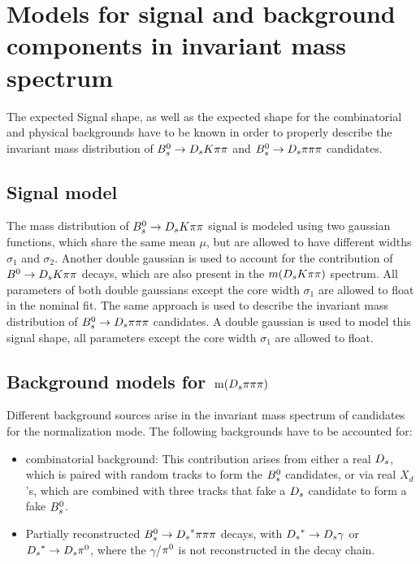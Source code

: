 \section{Models for signal and background components in invariant mass spectrum}
\label{sec: model}

The expected Signal shape, as well as the expected shape for the combinatorial and physical backgrounds have to be known in order to properly describe the invariant mass distribution of 
${{B}^0_{s}}\rightarrow{\ensuremath{{D}_{s}}}{\ensuremath{K}}{\ensuremath{\pi}}{\ensuremath{\pi}}$ and ${{B}^0_{s}}\rightarrow{\ensuremath{{D}_{s}}}{\ensuremath{\pi}}{\ensuremath{\pi}}{\ensuremath{\pi}}$ candidates.

\subsection{Signal model}
\label{subsec: signalmodel}
The mass distribution of ${{B}^0_{s}}\rightarrow{\ensuremath{{D}_{s}}}{\ensuremath{K}}{\ensuremath{\pi}}{\ensuremath{\pi}}$ signal is modeled using two gaussian functions, which share the same mean $\mu$, but are allowed to have different widths $\sigma_{1}$ and $\sigma_{2}$. 
Another double gaussian is used to account for the contribution of ${B}^{0}\rightarrow{\ensuremath{{D}_{s}}}{\ensuremath{K}}{\ensuremath{\pi}}{\ensuremath{\pi}}$ decays, which are also present in the $m({{D}_{s}}{K}{\pi}{\pi})$ spectrum. 
All parameters of both double gaussians except the core width $\sigma_{1}$  are allowed to float in the nominal fit. \newline
The same approach is used to describe the invariant mass distribution of ${{B}^0_{s}}\rightarrow{\ensuremath{{D}_{s}}}{\ensuremath{\pi}}{\ensuremath{\pi}}{\ensuremath{\pi}}$ candidates. 
A double gaussian is used to model this signal shape, all parameters except the core width $\sigma_{1}$ are allowed to float.

\subsection{Background models for $\mathrm{ \,m}({{D}_{s}}{\pi}{\pi}{\pi})$} 
\label{subsec: BkginNorm}
Different background sources arise in the invariant mass spectrum of candidates for the normalization mode. \newline
The following backgrounds have to be accounted for:
\begin{itemize}

\item combinatorial background: This contribution arises from either a real ${{D}_{s}}$, which is paired with random tracks to form the ${{B}^0_{s}}$ candidates, or via real $X_{d}$'s, which are combined with three tracks that fake a ${{D}_{s}}$ candidate to form a fake ${{B}^0_{s}}$.   

\item Partially reconstructed ${{B}^0_{s}}\rightarrow{\ensuremath{{D}_{s}}}^{*}{\pi}{\pi}{\pi}$ decays, with ${{D}_{s}}^{*}\rightarrow{\ensuremath{{D}_{s}}}\gamma$ or ${{D}_{s}}^{*}\rightarrow{\ensuremath{{D}_{s}}}{\ensuremath{{\pi}^0}}$, where the $\gamma$/${{\pi}^0}$ is not reconstructed in the decay chain. 

\end{itemize}

